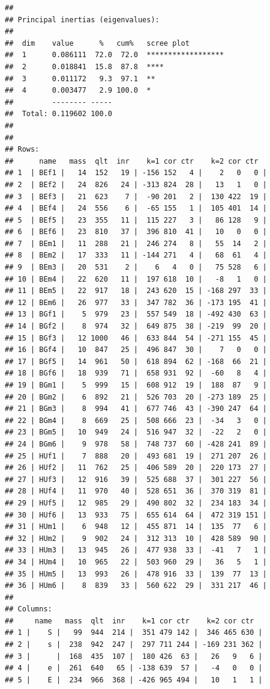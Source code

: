 \documentclass[
  finnish,
]{book}
\begin{document}
\begin{verbatim}
## 
## Principal inertias (eigenvalues):
## 
##  dim    value      %   cum%   scree plot               
##  1      0.086111  72.0  72.0  ******************       
##  2      0.018841  15.8  87.8  ****                     
##  3      0.011172   9.3  97.1  **                       
##  4      0.003477   2.9 100.0  *                        
##         -------- -----                                 
##  Total: 0.119602 100.0                                 
## 
## 
## Rows:
##      name   mass  qlt  inr    k=1 cor ctr    k=2 cor ctr  
## 1  | BEf1 |   14  152   19 | -156 152   4 |    2   0   0 |
## 2  | BEf2 |   24  826   24 | -313 824  28 |   13   1   0 |
## 3  | BEf3 |   21  623    7 |  -90 201   2 |  130 422  19 |
## 4  | BEf4 |   24  556    6 |  -65 155   1 |  105 401  14 |
## 5  | BEf5 |   23  355   11 |  115 227   3 |   86 128   9 |
## 6  | BEf6 |   23  810   37 |  396 810  41 |   10   0   0 |
## 7  | BEm1 |   11  288   21 |  246 274   8 |   55  14   2 |
## 8  | BEm2 |   17  333   11 | -144 271   4 |   68  61   4 |
## 9  | BEm3 |   20  531    2 |    6   4   0 |   75 528   6 |
## 10 | BEm4 |   22  620   11 |  197 618  10 |   -8   1   0 |
## 11 | BEm5 |   22  917   18 |  243 620  15 | -168 297  33 |
## 12 | BEm6 |   26  977   33 |  347 782  36 | -173 195  41 |
## 13 | BGf1 |    5  979   23 |  557 549  18 | -492 430  63 |
## 14 | BGf2 |    8  974   32 |  649 875  38 | -219  99  20 |
## 15 | BGf3 |   12 1000   46 |  633 844  54 | -271 155  45 |
## 16 | BGf4 |   10  847   25 |  496 847  30 |    7   0   0 |
## 17 | BGf5 |   14  961   50 |  618 894  62 | -168  66  21 |
## 18 | BGf6 |   18  939   71 |  658 931  92 |  -60   8   4 |
## 19 | BGm1 |    5  999   15 |  608 912  19 |  188  87   9 |
## 20 | BGm2 |    6  892   21 |  526 703  20 | -273 189  25 |
## 21 | BGm3 |    8  994   41 |  677 746  43 | -390 247  64 |
## 22 | BGm4 |    8  669   25 |  508 666  23 |  -34   3   0 |
## 23 | BGm5 |   10  949   24 |  516 947  32 |  -22   2   0 |
## 24 | BGm6 |    9  978   58 |  748 737  60 | -428 241  89 |
## 25 | HUf1 |    7  888   20 |  493 681  19 |  271 207  26 |
## 26 | HUf2 |   11  762   25 |  406 589  20 |  220 173  27 |
## 27 | HUf3 |   12  916   39 |  525 688  37 |  301 227  56 |
## 28 | HUf4 |   11  970   40 |  528 651  36 |  370 319  81 |
## 29 | HUf5 |   12  985   29 |  490 802  32 |  234 183  34 |
## 30 | HUf6 |   13  933   75 |  655 614  64 |  472 319 151 |
## 31 | HUm1 |    6  948   12 |  455 871  14 |  135  77   6 |
## 32 | HUm2 |    9  902   24 |  312 313  10 |  428 589  90 |
## 33 | HUm3 |   13  945   26 |  477 938  33 |  -41   7   1 |
## 34 | HUm4 |   10  965   22 |  503 960  29 |   36   5   1 |
## 35 | HUm5 |   13  993   26 |  478 916  33 |  139  77  13 |
## 36 | HUm6 |    8  839   33 |  560 622  29 |  331 217  46 |
## 
## Columns:
##     name   mass  qlt  inr    k=1 cor ctr    k=2 cor ctr  
## 1 |    S |   99  944  214 |  351 479 142 |  346 465 630 |
## 2 |    s |  238  942  247 |  297 711 244 | -169 231 362 |
## 3 |      |  168  435  107 |  180 426  63 |   26   9   6 |
## 4 |    e |  261  640   65 | -138 639  57 |   -4   0   0 |
## 5 |    E |  234  966  368 | -426 965 494 |   10   1   1 |
\end{verbatim}
\end{document}
